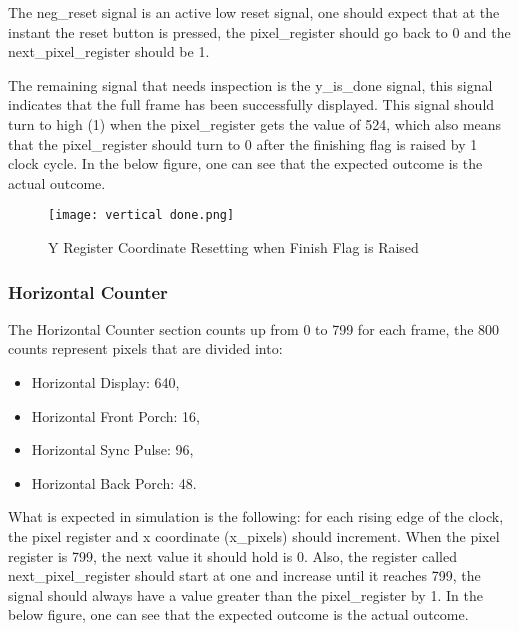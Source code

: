 \par The neg\_reset signal is an active low reset signal, one should expect that at the instant the reset button is pressed, the pixel\_register should go back to 0 and the next\_pixel\_register should be 1. \newline

\par The remaining signal that needs inspection is the y\_is\_done signal, this signal indicates that the full frame has been successfully displayed. This signal should turn to high (1) when the pixel\_register gets the value of 524, which also means that the pixel\_register should turn to 0 after the finishing flag is raised by 1 clock cycle. In the below figure, one can see that the expected outcome is the actual outcome. \newline

\begin{figure}[H]
    \centering
    \texttt{[image: vertical done.png]}
    \caption{ Y Register Coordinate Resetting when Finish Flag is Raised }
    \label{fig:VdoneFlag}  
\end{figure}

\subsubsection{Horizontal Counter}
\par The Horizontal Counter section counts up from 0 to 799 for each frame, the 800 counts represent pixels that are divided into: 
\begin{itemize}
    \item Horizontal Display: 640,
    \item Horizontal Front Porch: 16,
    \item Horizontal Sync Pulse: 96,
    \item Horizontal Back Porch: 48.
\end{itemize}

\par What is expected in simulation is the following: for each rising edge of the clock, the pixel register and x coordinate (x\_pixels) should increment. When the pixel register is 799, the next value it should hold is 0. Also, the register called next\_pixel\_register should start at one and increase until it reaches 799, the signal should always have a value greater than the pixel\_register by 1. In the below figure, one can see that the expected outcome is the actual outcome. \newline


